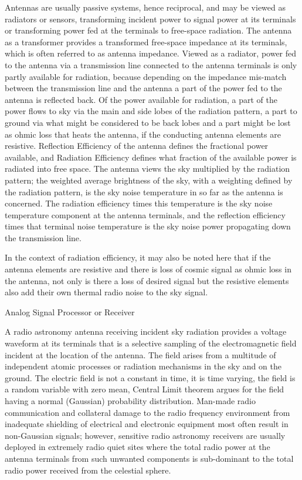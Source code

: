   Antennas are usually passive systems, hence reciprocal, and may be viewed as radiators or sensors, transforming incident power to signal power at its terminals or transforming power fed at the terminals to free-space radiation.  The antenna as a transformer provides a transformed free-space impedance at its terminals, which is often referred to as antenna impedance. Viewed as a radiator, power fed to the antenna via a transmission line connected to the antenna terminals is only partly available for radiation, because depending on the impedance mis-match between the transmission line and the antenna a part of the power fed to the antenna is reflected back. Of the power available for radiation, a part of the power flows to sky via the main and side lobes of the radiation pattern, a part to ground via what might be considered to be back lobes and a part might be lost as ohmic loss that heats the antenna, if the conducting antenna elements are resistive.  Reflection Efficiency of the antenna defines the fractional power available, and Radiation Efficiency defines what fraction of the available power is radiated into free space.  The antenna views the sky multiplied by the radiation pattern; the weighted average brightness of the sky, with a weighting defined by the radiation pattern, is the sky noise temperature in so far as the antenna is concerned. The radiation efficiency times this temperature is the sky noise temperature component at the antenna terminals, and the reflection efficiency times that terminal noise temperature is the sky noise power propagating down the transmission line.  
  
  In the context of radiation efficiency, it may also be noted here that if the antenna elements are resistive and there is loss of cosmic signal as ohmic loss in the antenna, not only is there a loss of desired signal but the resistive elements also add their own thermal radio noise to the sky signal. 
  
\item
  Analog Signal Processor or Receiver
  
  A radio astronomy antenna receiving incident sky radiation provides a voltage waveform at its terminals that is a selective sampling of the electromagnetic field incident at the location of the antenna.  The field arises from a multitude of independent atomic processes or radiation mechanisms in the sky and on the ground.  The electric field is not a constant in time, it is time varying, the field is a random variable with zero mean, Central Limit theorem argues for the field having a normal (Gaussian) probability distribution. Man-made radio communication and collateral damage to the radio frequency environment from inadequate shielding of electrical and electronic equipment most often result in non-Gaussian signals; however, sensitive radio astronomy receivers are usually deployed in extremely radio quiet sites where the total radio power at the antenna terminals from such unwanted components is sub-dominant to the total radio power received from the celestial sphere.
  
